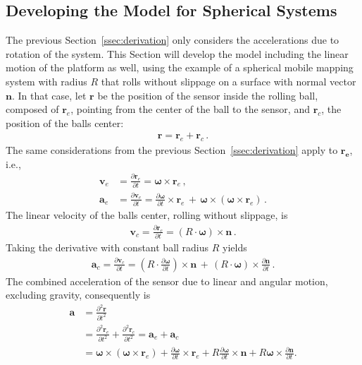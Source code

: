 \documentclass[journal]{IEEEtran}
\renewcommand{\vec}[1]{\boldsymbol{#1}}
\begin{document}
\subsection{Developing the Model for Spherical Systems}
The previous Section~\ref{ssec:derivation} only considers the accelerations due
to rotation of the system. This Section will develop the model including the
linear motion of the platform as well, using the example of a spherical mobile
mapping system with radius $R$ that rolls without slippage on a surface with
normal vector $\vec{n}$. In that case, let $\vec{r}$ be the position of the
sensor inside the rolling ball, composed of $\vec{r}_e$, pointing from the
center of the ball to the sensor, and $\vec{r}_c$, the position of the balls
center:
\begin{align}
  \vec{r} = \vec{r}_e + \vec{r}_c \,.
\end{align}
The same considerations from the previous Section~\ref{ssec:derivation} apply to $\vec{r_e}$, i.e.,
\begin{align}
  \vec{v}_e & = \frac{\partial \vec{r}_e}{\partial t} = \vec{\omega} \!\times\! \vec{r}_e \, , \\
  \vec{a}_e & = \frac{\partial \vec{v}_e}{\partial t} = \frac{\partial \vec{\omega}}{\partial t} \!\times\! \vec{r}_e \, + \, \vec{\omega} \!\times\! \left( \vec{\omega} \!\times\! \vec{r}_e \right) \, .
\end{align}
The linear velocity of the balls center, rolling without slippage, is
\begin{align}
  \vec{v}_c = \frac{\partial \vec{r}_c}{\partial t} = \left( R \cdot \vec{\omega} \right) \!\times\! \vec{n} \,.
\end{align}
Taking the derivative with constant ball radius $R$ yields
\begin{align}
  \vec{a}_c = \frac{\partial \vec{v}_c}{\partial t} = ( R \cdot \frac{\partial \vec{\omega}}{\partial t} ) \!\times\! \vec{n} \, + \, \left( R \cdot \vec{\omega} \right) \!\times\! \frac{\partial \vec{n}}{\partial t} \,.
\end{align}
The combined acceleration of the sensor due to linear and angular motion, excluding gravity, consequently is
\begin{align}
  \vec{a} & = \frac{\partial^2 \vec{r}}{\partial t^2} \nonumber \\
          & = \frac{\partial^2 \vec{r}_e}{\partial t^2} + \frac{\partial^2 \vec{r}_c}{\partial t^2} = \vec{a}_e + \vec{a}_c  \\
          & = \vec{\omega} \!\times\! \left( \vec{\omega} \!\times\! \vec{r}_e \right) +  \frac{\partial \vec{\omega}}{\partial t} \!\times\! \vec{r}_e  +  R \frac{\partial \vec{\omega}}{\partial t} \!\times\! \vec{n} +  R \vec{\omega} \!\times\! \frac{\partial \vec{n}}{\partial t}. \nonumber
\end{align}
\end{document}
